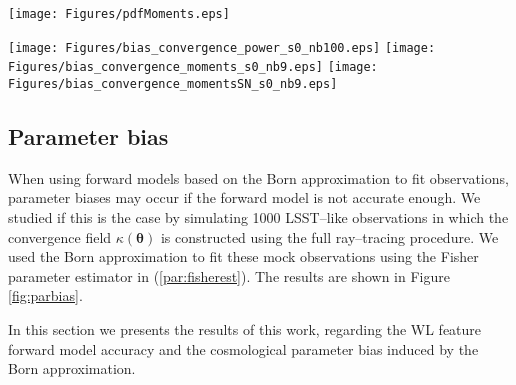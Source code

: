 \documentclass[reprint,aps,prd,superscriptaddress,showkeys,showpacs]{revtex4-1}
\newcommand{\bb}[1]{\mathbf{#1}}
\newcommand\pt{\pmb{\theta}}
\begin{document}
\begin{figure*}
\begin{center}
\texttt{[image: Figures/pdfMoments.eps]}
\end{center}
\caption{Probability distribution function (PDF) of the 9 $\kappa$ moments defined in (\ref{par:moments}), over 8192 realizations of the fiducial cosmological model $\bb{p}_0$. We show both the PDFs obtained with full ray--tracing (blue) and the Born approximation (green). No shape noise has been added. The $\kappa$ maps were smoothed with a Gaussian kernel of size $\theta_G=0.5\,{\rm arcmin}$ before measuring the moments.}
\label{fig:pdfMoments}
\end{figure*} 

\begin{figure*}
\begin{center}
\texttt{[image: Figures/bias\_convergence\_power\_s0\_nb100.eps]}
\texttt{[image: Figures/bias\_convergence\_moments\_s0\_nb9.eps]}
\texttt{[image: Figures/bias\_convergence\_momentsSN\_s0\_nb9.eps]}
\end{center}
\caption{Distribution of the parameter estimator (\ref{par:fisherest}) over 1000 realizations of an LSST--like survey. We show parameter estimates obtained using the noiseless $\kappa$ power spectrum (top panel), the noiseless $\kappa$ moments defined in (\ref{par:moments}) (middle panel) and the noisy $\kappa$ moments, based on a galaxy density of $15\,{\rm arcmin}^{-2}$ (bottom panel). We show both a control case, in which the observation has been constructed with the Born approximation (blue), and the real case, in which the observation has been constructed with full ray--tracing (green).}
\label{fig:parbias}
\end{figure*}


\subsection{Parameter bias}
When using forward models based on the Born approximation to fit observations, parameter biases may occur if the forward model is not accurate enough. We studied if this is the case by simulating 1000 LSST--like observations in which the convergence field $\kappa(\pt)$ is constructed using the full ray--tracing procedure. We used the Born approximation to fit these mock observations using the Fisher parameter estimator in (\ref{par:fisherest}). The results are shown in Figure \ref{fig:parbias}. 

In this section we presents the results of this work, regarding the WL feature forward model accuracy and the cosmological parameter bias induced by the Born approximation. 
\end{document}
